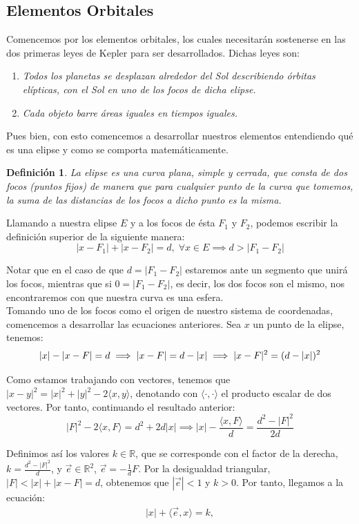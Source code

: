 \documentclass[11pt]{book}
\newtheorem{definition}[theorem]{Definición}
\begin{document}
\subsection{Elementos Orbitales}
\label{subsec:orbital_elements}
Comencemos por los elementos orbitales, los cuales necesitarán sostenerse en las dos primeras leyes de Kepler para ser desarrollados. Dichas leyes son:

\begin{enumerate}
\item \textit{Todos los planetas se desplazan alrededor del Sol describiendo órbitas elípticas, con el Sol en uno de los focos de dicha elipse.}
\item \textit{Cada objeto barre áreas iguales en tiempos iguales.}
\end{enumerate}

Pues bien, con esto comencemos a desarrollar nuestros elementos entendiendo qué es una elipse y como se comporta matemáticamente.
\begin{definition}
La elipse es una curva plana, simple y cerrada, que consta de dos focos (puntos fijos) de manera que para cualquier punto de la curva que tomemos, la suma de las distancias de los focos a dicho punto es la misma.
\end{definition}

Llamando a nuestra elipse $E$ y a los focos de ésta $F_1$ y $F_2$, podemos escribir la definición superior de la siguiente manera:
\[
|x-F_1|+|x-F_2|=d, \; \forall x \in E \implies d>|F_1-F_2|
\]

Notar que en el caso de que $d=|F_1-F_2|$ estaremos ante un segmento que unirá los focos, mientras que si $0=|F_1-F_2|$, es decir, los dos focos son el mismo, nos encontraremos con que nuestra curva es una esfera.\\

Tomando uno de los focos como el origen de nuestro sistema de coordenadas, comencemos a desarrollar las ecuaciones anteriores. Sea $x$ un punto de la elipse, tenemos:
\[
|x|-|x-F|=d \implies |x-F|=d-|x| \implies |x-F|^2=(d-|x|)^2\\
\]

Como estamos trabajando con vectores, tenemos que $|x-y|^2=|x|^2+|y|^2-2\langle x,y\rangle$, denotando con $\langle\cdot,\cdot\rangle$ el producto escalar de dos vectores. Por tanto, continuando el resultado anterior:
\[
|F|^2-2\langle x,F\rangle=d^2+2d|x| \implies |x|-\frac{\langle x,F\rangle}{d}=\frac{d^2-|F|^2}{2d}
\]

Definimos así los valores $k\in\mathbb{R}$, que se corresponde con el factor de la derecha, $k=\frac{d^2-|F|^2}{d}$, y $\vec{e}\in\mathbb{R}^2$, $\vec{e}=-\frac{1}{d}F$. Por la desigualdad triangular, $|F|<|x|+|x-F|=d$, obtenemos que $|\vec{e}|<1$ y $k>0$. Por tanto, llegamos a la ecuación:
\begin{align}
|x|+\langle \vec{e},x\rangle=k,
\label{eq:elipse_cartesiana}
\end{align}
\end{document}

